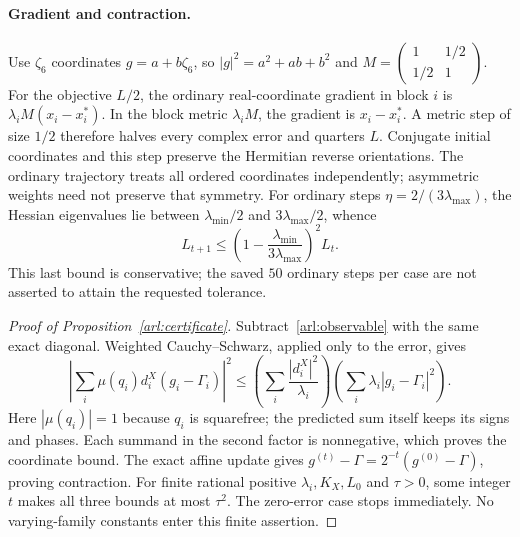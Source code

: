 \documentclass[11pt]{article}
\theoremstyle{definition}\newtheorem{definition}[theorem]{Definition}
\theoremstyle{remark}\newtheorem{remark}[theorem]{Remark}
\begin{document}
\paragraph{Gradient and contraction.}
Use $\zeta_6$ coordinates $g=a+b\zeta_6$, so
$|g|^2=a^2+ab+b^2$ and
$M=\left(\begin{smallmatrix}1&1/2\\1/2&1\end{smallmatrix}\right)$.
For the objective $L/2$, the ordinary real-coordinate gradient in block $i$
is $\lambda_i M(x_i-x_i^*)$.
In the block metric $\lambda_iM$, the gradient is $x_i-x_i^*$.
A metric step of size $1/2$ therefore halves every complex error and quarters
$L$. Conjugate initial coordinates and this step preserve the Hermitian
reverse orientations. The ordinary trajectory treats all ordered coordinates
independently; asymmetric weights need not preserve that symmetry.
For ordinary steps $\eta=2/(3\lambda_{\max})$, the Hessian eigenvalues
lie between $\lambda_{\min}/2$ and $3\lambda_{\max}/2$, whence
\[
 L_{t+1}\le\left(1-\frac{\lambda_{\min}}{3\lambda_{\max}}\right)^2L_t.
\]
This last bound is conservative; the saved $50$ ordinary steps per case are
not asserted to attain the requested tolerance.

\begin{proof}[Proof of Proposition~\ref{arl:certificate}]
Subtract~\eqref{arl:observable} with the same exact diagonal. Weighted
Cauchy--Schwarz, applied only to the error, gives
\[
 \left|\sum_i\mu(q_i)d_i^X(g_i-\Gamma_i)\right|^2
 \le\left(\sum_i\frac{|d_i^X|^2}{\lambda_i}\right)
     \left(\sum_i\lambda_i|g_i-\Gamma_i|^2\right).
\]
Here $|\mu(q_i)|=1$ because $q_i$ is squarefree; the predicted sum itself
keeps its signs and phases. Each summand in the second factor is nonnegative,
which proves the coordinate bound. The exact affine update gives
$g^{(t)}-\Gamma=2^{-t}(g^{(0)}-\Gamma)$, proving contraction.
For finite rational positive $\lambda_i,K_X,L_0$ and $\tau>0$, some integer
$t$ makes all three bounds at most $\tau^2$. The zero-error case stops
immediately. No varying-family constants enter this finite assertion.
\end{proof}
\end{document}
